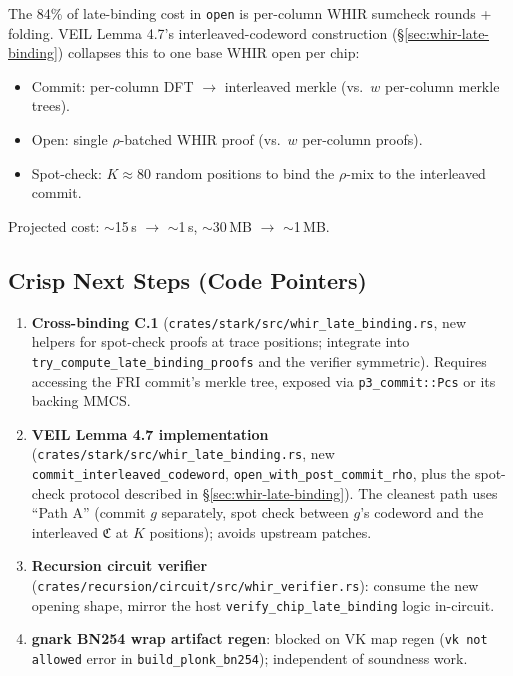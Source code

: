 The 84\% of late-binding cost in \texttt{open} is per-column WHIR
sumcheck rounds + folding.  VEIL Lemma 4.7's interleaved-codeword
construction (\S\ref{sec:whir-late-binding}) collapses this to
one base WHIR open per chip:
\begin{itemize}
  \item Commit: per-column DFT $\to$ interleaved merkle (vs.~$w$
        per-column merkle trees).
  \item Open: single $\rho$-batched WHIR proof (vs.~$w$ per-column
        proofs).
  \item Spot-check: $K \approx 80$ random positions to bind the
        $\rho$-mix to the interleaved commit.
\end{itemize}
Projected cost: $\sim$15\,s $\to$ $\sim$1\,s, $\sim$30\,MB $\to$
$\sim$1\,MB.

\subsection{Crisp Next Steps (Code Pointers)}

\begin{enumerate}
  \item \textbf{Cross-binding C.1}
        (\texttt{crates/stark/src/whir\_late\_binding.rs}, new
        helpers for spot-check proofs at trace positions; integrate
        into \texttt{try\_compute\_late\_binding\_proofs} and the
        verifier symmetric).  Requires accessing the FRI commit's
        merkle tree, exposed via \texttt{p3\_commit::Pcs} or its
        backing MMCS.
  \item \textbf{VEIL Lemma 4.7 implementation}
        (\texttt{crates/stark/src/whir\_late\_binding.rs}, new
        \texttt{commit\_interleaved\_codeword},
        \texttt{open\_with\_post\_commit\_rho}, plus the spot-check
        protocol described in \S\ref{sec:whir-late-binding}).  The
        cleanest path uses ``Path A'' (commit $g$ separately, spot
        check between $g$'s codeword and the interleaved $\mathfrak{C}$
        at $K$ positions); avoids upstream patches.
  \item \textbf{Recursion circuit verifier}
        (\texttt{crates/recursion/circuit/src/whir\_verifier.rs}):
        consume the new opening shape, mirror the host
        \texttt{verify\_chip\_late\_binding} logic in-circuit.
  \item \textbf{gnark BN254 wrap artifact regen}: blocked on VK map
        regen (\texttt{vk not allowed} error in
        \texttt{build\_plonk\_bn254}); independent of soundness work.
\end{enumerate}

